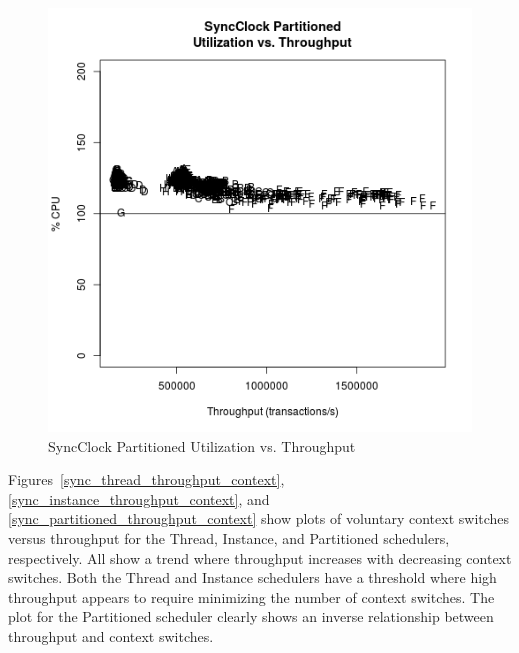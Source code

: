 \begin{figure}
\center
\includegraphics[height=.4\textheight]{sync_partitioned_throughput_utilization.png}
\caption{SyncClock Partitioned Utilization vs. Throughput}
\label{sync_partitioned_throughput_utilization}
\end{figure}

Figures~\ref{sync_thread_throughput_context}, \ref{sync_instance_throughput_context}, and \ref{sync_partitioned_throughput_context} show plots of voluntary context switches versus throughput for the Thread, Instance, and Partitioned schedulers, respectively.
All show a trend where throughput increases with decreasing context switches.
Both the Thread and Instance schedulers have a threshold where high throughput appears to require minimizing the number of context switches.
The plot for the Partitioned scheduler clearly shows an inverse relationship between throughput and context switches.

